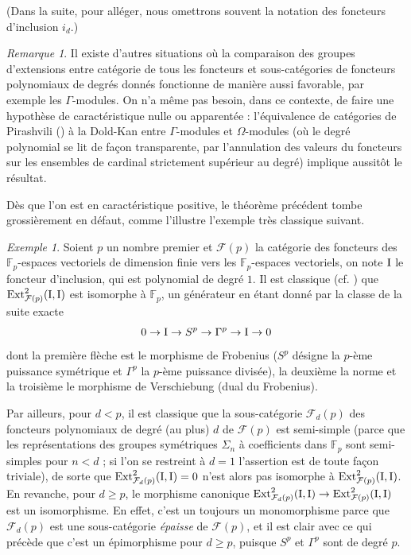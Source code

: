 \documentclass[a4paper,10pt]{article}
\newcommand{\F}{{\mathcal{F}}}
\theoremstyle{definition}
\theoremstyle{remark}
\newtheorem{rem}[thm]{Remarque}
\newtheorem{ex}[thm]{Exemple}
\begin{document}
(Dans la suite, pour alléger, nous omettrons souvent la notation des foncteurs d'inclusion $i_d$.)

\begin{rem}
 Il existe d'autres situations où la comparaison des groupes d'extensions entre catégorie de tous les foncteurs et sous-catégories de foncteurs polynomiaux de degrés donnés fonctionne de manière aussi favorable, par exemple les $\Gamma$-modules. On n'a même pas besoin, dans ce contexte, de faire une hypothèse de caractéristique nulle ou apparentée : l'équivalence de catégories de Pirashvili (\cite{PDK}) à la Dold-Kan entre $\Gamma$-modules et $\Omega$-modules (où le degré polynomial se lit de façon transparente, par l'annulation des valeurs du foncteurs sur les ensembles de cardinal strictement supérieur au degré) implique aussitôt le résultat.
\end{rem}

Dès que l'on est en caractéristique positive, le théorème précédent tombe grossièrement en défaut, comme l'illustre l'exemple très classique suivant.

\begin{ex}\label{ex-cl}
 Soient $p$ un nombre premier et $\F(p)$ la catégorie des foncteurs des $\mathbb{F}_p$-espaces vectoriels de dimension finie vers les $\mathbb{F}_p$-espaces vectoriels, on note ${\rm I}$ le foncteur d'inclusion, qui est polynomial de degré $1$. Il est classique (cf. \cite{FLS}) que ${\rm Ext}^2_{\F(p)}({\rm I},{\rm I})$ est isomorphe à $\mathbb{F}_p$, un générateur en étant donné par la classe de la suite exacte
$$0\to {\rm I}\to S^p\to\Gamma^p\to {\rm I}\to 0$$
dont la première flèche est le morphisme de Frobenius ($S^p$ désigne la $p$-ème puissance symétrique et $\Gamma^p$ la $p$-ème puissance divisée), la deuxième la norme et la troisième le morphisme de Verschiebung (dual du Frobenius).

Par ailleurs, pour $d<p$, il est classique que la sous-catégorie $\F_d(p)$ des foncteurs polynomiaux de degré (au plus) $d$ de $\F(p)$ est semi-simple (parce que les représentations des groupes symétriques $\Sigma_n$ à coefficients dans $\mathbb{F}_p$ sont semi-simples pour $n<d$ ; si l'on se restreint à $d=1$ l'assertion est de toute façon triviale), de sorte que ${\rm Ext}^2_{\F_d(p)}({\rm I},{\rm I})=0$ n'est alors pas isomorphe à ${\rm Ext}^2_{\F(p)}({\rm I},{\rm I})$. En revanche, pour $d\geq p$, le morphisme canonique ${\rm Ext}^2_{\F_d(p)}({\rm I},{\rm I})\to{\rm Ext}^2_{\F(p)}({\rm I},{\rm I})$ est un isomorphisme. En effet, c'est un toujours un monomorphisme parce que $\F_d(p)$ est une sous-catégorie {\em épaisse} de $\F(p)$, et il est clair avec ce qui précède que c'est un épimorphisme pour $d\geq p$, puisque $S^p$ et $\Gamma^p$ sont de degré $p$.
\end{ex}
\end{document}
